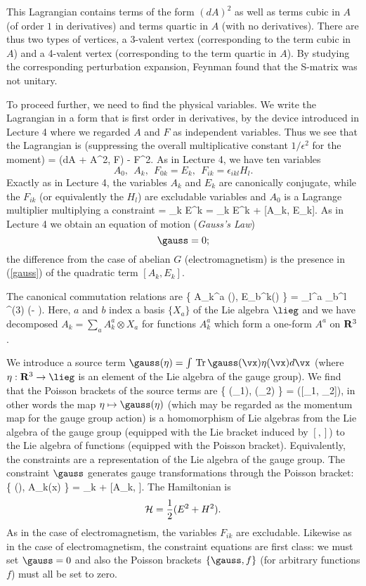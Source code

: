 This Lagrangian contains terms of the form $(d A)^2$ as well 
as    terms cubic in $A$ (of order $1$ in derivatives) and terms 
quartic in $A$ (with no derivatives). There are thus two types of vertices,
a 3-valent  vertex (corresponding to the term cubic in $A$) and a 4-valent
vertex (corresponding to the term quartic in $A$). By studying the 
corresponding perturbation expansion, Feynman found that the S-matrix 
was not unitary. 

To proceed further, we need to find the physical variables. We write the 
Lagrangian in a form that is first order in derivatives, by the device
introduced in Lecture 4 where we regarded $A$ and $F$ as independent
variables. Thus we see that the Lagrangian is (suppressing the overall
multiplicative constant $1/\epsilon^2$ for the moment)
\beq \calL = \Tr (dA + A^2, F) - \half \Tr F^2. \eeq
As in Lecture 4, we have ten variables
$$ A_0, ~~A_k, ~~F_{0k} = E_k, ~~F_{ik} = \epsilon_{ikl} H_l. $$
Exactly as in Lecture 4, the variables $A_k$ and $E_k$ are canonically 
conjugate, while the $F_{ik}$ (or equivalently the $H_l$) are excludable
variables and $A_0$ is a Lagrange multiplier multiplying a constraint
\beq \label{gauss}
\gauss = \nabla_k E^k = \partial_k E^k + [A_k, E_k]. \eeq
As in Lecture 4 we obtain an  equation of motion  ({\em Gauss's Law}) 
$$ \gauss = 0;  $$
the difference from the case of abelian $G$ (electromagnetism) is the
presence in (\ref{gauss}) of the quadratic term 
$[A_k, E_k]$. 





The canonical commutation relations are
\beq \left \{  A_k^a (\vx), E_b^k(\vy)  \right \} = 
\delta_l^a \delta_b^l \delta^{(3) } (\vx - \vy). \eeq
Here, $a$ and $b$ index a basis $\{ X_a\} $ of the Lie algebra $\lieg$ and 
we have decomposed 
$A_k = \sum_a A_k^a \otimes X_a $ for functions $A_k^a$ which form a 
one-form $A^a$ on ${{\bf R }}^3$. 


We introduce a source term $\gauss(\eta) = \int \Tr
 \gauss(\vx) \eta(\vx) d\vx $
(where $\eta : \RR^3 \to \lieg$ is an element of the Lie algebra of the
gauge group). 
We find that the Poisson brackets of the source terms are 
\beq \left \{ \gauss(\eta_1), \gauss(\eta_2)  \right \} 
= \gauss ([\eta_1, \eta_2]), \eeq
in other words the map $\eta \mapsto 
\gauss(\eta)$  (which may be regarded as the 
momentum map for the gauge group action) is a homomorphism of Lie algebras 
from 
the Lie algebra of the gauge group (equipped with the Lie bracket
induced by $[, ]$) to the Lie algebra of functions (equipped with the 
Poisson bracket). Equivalently, the constraints are a representation
of the Lie algebra of the gauge group. The constraint
$\gauss$ generates gauge transformations through the Poisson bracket:
\beq \left 
\{ \gauss(\eta), A_k(x) \right \} = 
\partial_k \eta + [A_k, \eta ]. \eeq
The Hamiltonian is 
$$ {\mbox{$\cal H$}} = {\frac{1}{2} } (E^2 + H^2). $$
As in the case of electromagnetism, the variables $F_{ik}$ are excludable. 
Likewise as in the case of electromagnetism, the constraint equations are
first class: we must set $\gauss = 0 $ and also the 
Poisson brackets $\{ \gauss, f \}  $ (for arbitrary
functions $f$) must all be set to zero.

